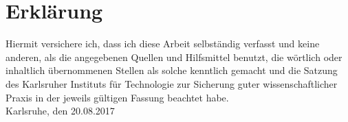 \documentclass[12pt,a4paper]{scrartcl}
\theoremstyle{plain}
\theoremstyle{definition}
\newcommand{\2}{\mathbb{Z} / 2 \mathbb{Z}}
\newcommand{\1}{\bar{1}}
\newcommand{\0}{\bar{0}}
\begin{document}
      

\newpage
  
 \thispagestyle{empty}


\vspace*{8cm}


\section*{Erklärung}

Hiermit versichere ich, dass ich diese Arbeit selbständig verfasst und keine anderen, als die angegebenen Quellen und Hilfsmittel benutzt, die wörtlich oder inhaltlich übernommenen Stellen als solche kenntlich gemacht und die Satzung des Karlsruher Instituts für Technologie zur Sicherung guter wissenschaftlicher Praxis in der jeweils gültigen Fassung beachtet habe. \\[10ex] 

\noindent
Karlsruhe, den 20.08.2017\\[5ex]

\end{document}
